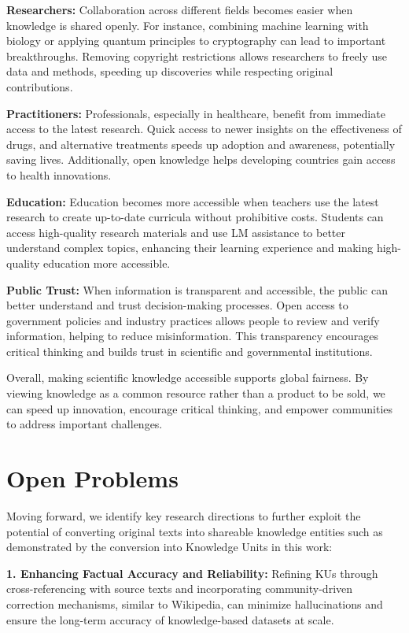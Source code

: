 \textbf{Researchers:} Collaboration across different fields becomes easier when knowledge is shared openly. For instance, combining machine learning with biology or applying quantum principles to cryptography can lead to important breakthroughs. Removing copyright restrictions allows researchers to freely use data and methods, speeding up discoveries while respecting original contributions.

\textbf{Practitioners:} Professionals, especially in healthcare, benefit from immediate access to the latest research. Quick access to newer insights on the effectiveness of drugs, and alternative treatments speeds up adoption and awareness, potentially saving lives. Additionally, open knowledge helps developing countries gain access to health innovations.

\textbf{Education:} Education becomes more accessible when teachers use the latest research to create up-to-date curricula without prohibitive costs. Students can access high-quality research materials and use LM assistance to better understand complex topics, enhancing their learning experience and making high-quality education more accessible.

\textbf{Public Trust:} When information is transparent and accessible, the public can better understand and trust decision-making processes. Open access to government policies and industry practices allows people to review and verify information, helping to reduce misinformation. This transparency encourages critical thinking and builds trust in scientific and governmental institutions.

Overall, making scientific knowledge accessible supports global fairness. By viewing knowledge as a common resource rather than a product to be sold, we can speed up innovation, encourage critical thinking, and empower communities to address important challenges.

\vspace{-0.2cm}
\section{Open Problems}
\vspace{-0.1cm}

Moving forward, we identify key research directions to further exploit the potential of converting original texts into shareable knowledge entities such as demonstrated by the conversion into Knowledge Units in this work:


\textbf{1. Enhancing Factual Accuracy and Reliability:}  Refining KUs through cross-referencing with source texts and incorporating community-driven correction mechanisms, similar to Wikipedia, can minimize hallucinations and ensure the long-term accuracy of knowledge-based datasets at scale.

